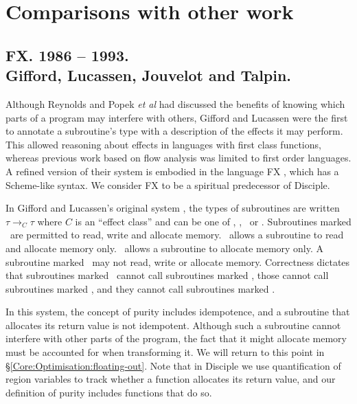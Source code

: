 
\clearpage{}
\section{Comparisons with other work}

\subsection{FX. 1986 -- 1993.\\
	Gifford, Lucassen, Jouvelot and Talpin.}

Although Reynolds \cite{reynolds:interference} and Popek \emph{et al} \cite{popek:euclid} had discussed the benefits of knowing which parts of a program may interfere with others, Gifford and Lucassen \cite{gifford:integrating} were the first to annotate a subroutine's type with a description of the effects it may perform. This allowed reasoning about effects in languages with first class functions, whereas previous work based on flow analysis \cite{banning:find-side-effects} was limited to first order languages. A refined version of their system is embodied in the language FX \cite{gifford:report-on-fx}, which has a Scheme-like syntax. We consider FX to be a spiritual predecessor of Disciple.

In Gifford and Lucassen's original system \cite{gifford:integrating}, the types of subroutines are written $\tau \to_C \tau$ where $C$ is an ``effect class'' and can be one of \scProcedure, \scObserver, \scFunction \ or \scPure. Subroutines marked \scProcedure \ are permitted to read, write and allocate memory. \scObserver \ allows a subroutine to read and allocate memory only. \scFunction \ allows a subroutine to allocate memory only. A subroutine marked \scPure \ may not read, write or allocate memory. Correctness dictates that subroutines marked \scPure \ cannot call subroutines marked \scFunction, those cannot call subroutines marked \scObserver, and they cannot call subroutines marked \scProcedure.

In this system, the concept of purity includes idempotence, and a subroutine that allocates its return value is not idempotent. Although such a subroutine cannot interfere with other parts of the program, the fact that it might allocate memory must be accounted for when transforming it. We will return to this point in \S\ref{Core:Optimisation:floating-out}. Note that in Disciple we use quantification of region variables to track whether a function allocates its return value, and our definition of purity includes functions that do so.

